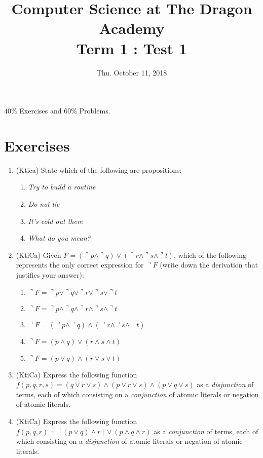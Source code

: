 \documentclass{article}
\title{
Computer Science at The Dragon Academy\\
Term 1 : Test 1%
}
\date{Thu. October 11, 2018}
\begin{document}
\maketitle
$40\%$ Exercises and $60\%$ Problems. 
\section{Exercises}
\begin{enumerate}
\item (Ktica) State which of the following are propositions:
\begin{enumerate}
\item {\sl Try to build a routine}
\item {\sl Do not lie}
\item {\sl It's cold out there}
\item {\sl What do you mean?}
\end{enumerate}
\item (KtiCa) Given $F=\left( \urcorner p \wedge \urcorner q \right)\vee \left( \urcorner r \wedge \urcorner s \wedge \urcorner t\right)$, which of the following represents 
the only correct expression for $\urcorner F$ (write down the derivation that justifies your answer):
\begin{enumerate}
\item $\urcorner F=\urcorner p \vee \urcorner q \vee \urcorner r \vee \urcorner s \vee \urcorner t$
\item $\urcorner F=\urcorner p \wedge \urcorner q \wedge \urcorner r \wedge \urcorner s \wedge \urcorner t$
\item $\urcorner F=\left(\urcorner p \wedge \urcorner q \right) \wedge \left(\urcorner r \wedge \urcorner s \wedge \urcorner t\right)$
\item $\urcorner F=\left(  p \wedge  q \right)\vee \left( r \wedge s \wedge t\right)$
\item $\urcorner F = \left(p\vee q\right)\wedge \left( r\vee s\vee t\right)$
\end{enumerate}
\item (KtiCa) Express the following function $f(p,q,r,s)=(q\vee r\vee s)\wedge (p\vee r \vee s)\wedge (p\vee q\vee s)$ as a {\sl disjunction} of terms,
each of which consisting on a {\sl conjunction} of atomic literals or negation of atomic literals.
\item (KtiCa) Express the following function $f(p,q,r)=\left[ (p\vee q)\wedge r\right]\vee (p\wedge q \wedge r)$ as a {\sl conjunction} of terms,
each of which consisting on a {\sl disjunction} of atomic literals or negation of atomic literals.
\end{enumerate}
\end{document}
